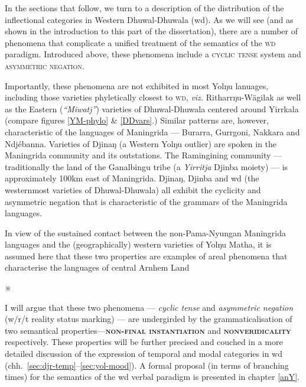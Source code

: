 In the sections that follow, we turn to a description of the distribution of the inflectional categories in Western Dhuwal-Dhuwala (\gls{wd}). As we will see (and as shown in the introduction to this part of the dissertation), there are a number of phenomena that complicate a unified treatment of the semantics of the \textsc{wd} paradigm. Introduced above, these phenomena include a \textsc{cyclic tense} system and \textsc{asymmetric negation}.


Importantly, these phenomena are not exhibited in most Yolŋu lanuages, including those varieties phyletically closest to \textsc{wd}, \textit{viz.} Ritharrŋu-Wägilak as well as the Eastern (\textit{``Miwatj''}) varieties of Dhuwal-Dhuwala centered around Yirrkala (compare figures \ref{YM-phylo} \& \ref{DDvars}.) Similar patterns are, however, characteristic of the languages of Maningrida --- Burarra, Gurrgoni, Nakkara and Ndjébanna. Varieties of Djinaŋ (a Western Yolŋu outlier) are spoken in the Maningrida community and its outstations. The Ramingining community --- traditionally the land of the Ganalbingu tribe (a \textit{Yirritja} Djinba moiety) --- is approximately 100km east of Maningrida. Djinaŋ, Djinba and \gls{wd} (the westernmost varieties of Dhuwal-Dhuwala) all exhibit the cyclicity and asymmetric negation that is characteristic of the grammars of the Maningrida languages.

In view of the sustained contact between the non-Pama-Nyungan Maningrida languages and the (geographically) western varieties of Yolŋu Matha, it is assumed here that these two properties are examples of areal phenomena that characterise the languages of central Arnhem Land \citetext{see appendix 2 of \citealt{Waters1989} for a short investigation of this perspective.}


\begin{center}
	
\huge\sf	 ※
	
\end{center}


\noindent I will argue that these two phenomena --- \textit{cyclic tense} and \textit{asymmetric negation} (w/r/t reality status marking) --- are undergirded by the grammaticalisation of two semantical properties---\textsc{\textbf{non-final instantiation}} and \textsc{\textbf{nonveridicality}} respectively. These properties will be further precised and couched in a more detailed discussion of the expression of temporal and modal categories in \gls{wd} (chh.~\ref{sec:djr-temp}--\ref{sec:yol-mood}). A formal proposal (in terms of branching times) for the semantics of the \gls{wd} verbal paradigm is presented in chapter \ref{anY}.


